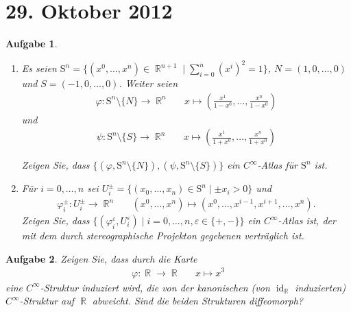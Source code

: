 \documentclass[paper=A4, twoside, chapterprefix=true, bibliography=totoc, headsepline]{scrbook}
\let\temp\phi{}
\let\phi\varphi{}
\let\varphi\temp{}
\let\temp\theta{}
\let\theta\vartheta{}
\let\vartheta\temp{}
\let\temp\epsilon{}
\let\epsilon\varepsilon{}
\let\varepsilon\temp{}
\let\temp\rho{}
\let\rho\varrho{}
\let\varrho\temp{}
\DeclareMathOperator{\R}{\mathbb{R}}
\DeclareMathOperator{\id}{id}       %
\theoremstyle{plain}
\theoremstyle{nonumberplain}
\theoremstyle{empty}
\theoremstyle{break}
\newtheorem{Aufg}{Aufgabe}
\begin{document}

\section{29. Oktober 2012}
\setcounter{Aufg}{0} %
\setcounter{Loes}{0}

\begin{Aufg}\begin{enumerate}[leftmargin=*,label=\alph*),widest=b]
\item
	Es seien $\mathrm{S}^n=\{(x^0,\dots,x^n)\in \R^{n+1} \mid \sum\limits_{i=0}^n (x^i)^2=1\}$, $N=(1,0,\dots,0)$ und $S=(-1,0,\dots,0)$.  Weiter seien
		\begin{align*}
			\phi: \mathrm{S}^n\setminus\{N\} \to \R^n && x \mapsto \left(\frac{x^1}{1-x^0},\dots,\frac{x^n}{1-x^0}\right)
		\end{align*}
	und
		\begin{align*}
			\psi: \mathrm{S}^n\setminus\{S\} \to \R^n && x \mapsto \left(\frac{x^1}{1+x^0},\dots,\frac{x^n}{1+x^0}\right)
		\end{align*}
	
	Zeigen Sie, dass $\{(\phi,  \mathrm{S}^n\setminus\{N\} ),(\psi,  \mathrm{S}^n\setminus\{S\})\}$ ein $C^\infty$-Atlas für $\mathrm{S}^n$ ist.
\item
	Für $i=0,\dots,n$ sei $U_i^\pm=\{(x_0,\dots,x_n)\in \mathrm{S}^n \mid \pm x_i>0\}$ und 
	\begin{align*}
		\phi_i^\pm :U_i^\pm \to \R^n && (x^0, \dots,x^n) \mapsto (x^0,\dots,x^{i-1},x^{i+1},\dots,x^n).
	\end{align*}
	Zeigen Sie, dass $\big\{(\phi_i^\epsilon,U_i^\epsilon) \mid i=0,\dots,n, \epsilon\in\{+,-\}\big\}$ ein $C^\infty$-Atlas ist, der mit dem durch stereographische Projekton gegebenen verträglich ist.
\end{enumerate}\end{Aufg}

\begin{Aufg}
Zeigen Sie, dass durch die Karte
\begin{align*}
	\phi: \R \to \R && x \mapsto x^3
\end{align*}
eine $C^\infty$-Struktur induziert wird, die von der kanonischen (von $\id_{\R}$ induzierten) $C^\infty$-Struktur auf $\R$ abweicht. 
Sind die beiden Strukturen diffeomorph?
\end{Aufg}
\end{document}

